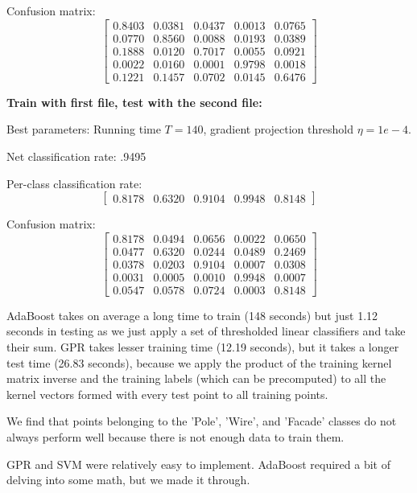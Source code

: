 \documentclass[letterpaper]{article}
\begin{document}
Confusion matrix:
$$\begin{bmatrix}
    0.8403 &   0.0381  &  0.0437  &  0.0013  &  0.0765\\
    0.0770  &  0.8560   & 0.0088   & 0.0193  &  0.0389\\
    0.1888  &  0.0120   & 0.7017   & 0.0055  &  0.0921\\
    0.0022  &  0.0160   & 0.0001   & 0.9798  &  0.0018\\
    0.1221  &  0.1457   & 0.0702   & 0.0145  &  0.6476
\end{bmatrix}$$

\textbf{Train with first file, test with the second file:}

Best parameters: Running time $T=140$, gradient projection threshold $\eta=1e-4$.

Net classification rate: .9495

Per-class classification rate: 
$$\begin{bmatrix}0.8178 &   0.6320 &   0.9104  &  0.9948  &  0.8148\end{bmatrix}$$

Confusion matrix:
$$\begin{bmatrix}
0.8178 &   0.0494   & 0.0656 &   0.0022  &  0.0650\\
    0.0477 &   0.6320  &  0.0244 &   0.0489 &   0.2469\\
    0.0378 &   0.0203 &   0.9104  &  0.0007  &  0.0308\\
    0.0031  &  0.0005 &   0.0010  &  0.9948  &  0.0007\\
    0.0547  &  0.0578   & 0.0724  &  0.0003  &  0.8148
\end{bmatrix}$$

AdaBoost takes on average a long time to train (148 seconds) but just 1.12 seconds in testing as we just apply a set of thresholded linear classifiers and take their sum. GPR takes lesser training time (12.19 seconds), but it takes a longer test time (26.83 seconds), because we apply the product of the training kernel matrix inverse and the training labels (which can be precomputed) to all the kernel vectors formed with every test point to all training points.

We find that points belonging to the 'Pole', 'Wire', and 'Facade' classes do not always perform well because there is not enough data to train them.

GPR and SVM were relatively easy to implement. AdaBoost required a bit of delving into some math, but 
we made it through.
\end{document}
